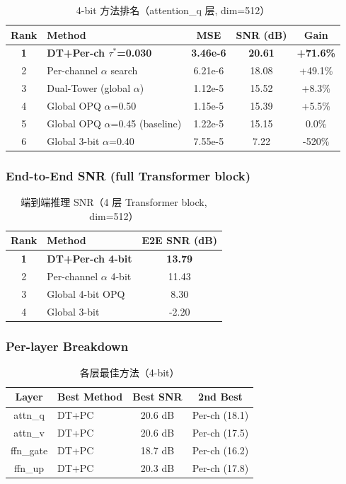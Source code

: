 \begin{table}[h]
\centering
\caption{4-bit 方法排名（attention\_q 层, dim=512）}
\begin{tabular}{c|l|c|c|c}
\hline
Rank & Method & MSE & SNR (dB) & Gain \\
\hline
\textbf{1} & \textbf{DT+Per-ch $\tau^*$=0.030} & \textbf{3.46e-6} & \textbf{20.61} & \textbf{+71.6\%} \\
2 & Per-channel $\alpha$ search & 6.21e-6 & 18.08 & +49.1\% \\
3 & Dual-Tower (global $\alpha$) & 1.12e-5 & 15.52 & +8.3\% \\
4 & Global OPQ $\alpha$=0.50 & 1.15e-5 & 15.39 & +5.5\% \\
5 & Global OPQ $\alpha$=0.45 (baseline) & 1.22e-5 & 15.15 & 0.0\% \\
6 & Global 3-bit $\alpha$=0.40 & 7.55e-5 & 7.22 & -520\% \\
\hline
\end{tabular}
\end{table}

\subsubsection{End-to-End SNR (full Transformer block)}

\begin{table}[h]
\centering
\caption{端到端推理 SNR（4 层 Transformer block, dim=512）}
\begin{tabular}{c|l|c}
\hline
Rank & Method & E2E SNR (dB) \\
\hline
\textbf{1} & \textbf{DT+Per-ch 4-bit} & \textbf{13.79} \\
2 & Per-channel $\alpha$ 4-bit & 11.43 \\
3 & Global 4-bit OPQ & 8.30 \\
4 & Global 3-bit & -2.20 \\
\hline
\end{tabular}
\end{table}

\subsubsection{Per-layer Breakdown}

\begin{table}[h]
\centering
\caption{各层最佳方法（4-bit）}
\begin{tabular}{c|l|c|c}
\hline
Layer & Best Method & Best SNR & 2nd Best \\
\hline
attn\_q & DT+PC & 20.6 dB & Per-ch (18.1) \\
attn\_v & DT+PC & 20.6 dB & Per-ch (17.5) \\
ffn\_gate & DT+PC & 18.7 dB & Per-ch (16.2) \\
ffn\_up & DT+PC & 20.3 dB & Per-ch (17.8) \\
\hline
\end{tabular}
\end{table}

